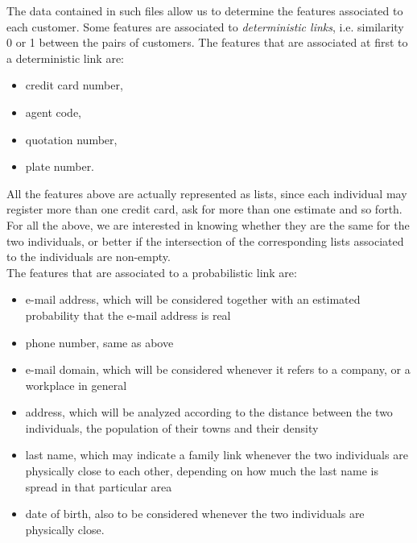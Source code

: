 \documentclass[a4paper,11pt]{book}
\begin{document}
The data contained in such files allow us to determine the features associated to each customer. Some features are associated to \textit{deterministic links}, i.e. similarity 0 or 1 between the pairs of customers. The features that are associated at first to a deterministic link are:
\begin{itemize}
\item credit card number,
\item agent code,
\item quotation number,
\item plate number.
\end{itemize}
All the features above are actually represented as lists, since each individual may register more than one credit card, ask for more than one estimate and so forth. For all the above, we are interested in knowing whether they are the same for the two individuals, or better if the intersection of the corresponding lists associated to the individuals are non-empty.\\
The features that are associated to a probabilistic link are: 
\begin{itemize}
\item e-mail address, which will be considered together with an estimated probability that the e-mail address is real 
\item phone number, same as above
\item e-mail domain, which will be considered whenever it refers to a company, or a workplace in general
\item address, which will be analyzed according to the distance between the two individuals, the population of their towns and their density
\item last name, which may indicate a family link whenever the two individuals are physically close to each other, depending on how much the last name is spread in that particular area
\item date of birth, also to be considered whenever the two individuals are physically close.
\end{itemize}
\end{document}
